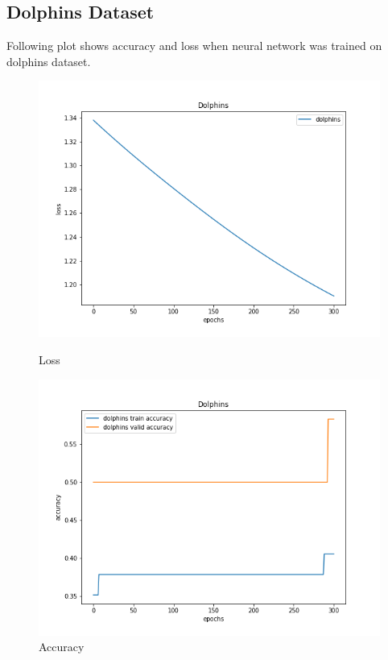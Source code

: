 \documentclass{article}
\begin{document}
\pagebreak
\subsection{Dolphins Dataset}
Following plot shows accuracy and loss when neural network was trained on dolphins dataset.

\begin{figure}[!htb]
	\includegraphics[width=\linewidth]{../output_plots/part_3_dolphins_loss.png}
	\caption{Loss}\label{fig:part_3_dolphins_loss}
	\endminipage\hfill
	\includegraphics[width=\linewidth]{../output_plots/part_3_dolphins_accuracy.png}
	\caption{Accuracy}\label{fig:part_3_dolphins_accuracy}
	\endminipage\hfill
\end{figure}
\end{document}
